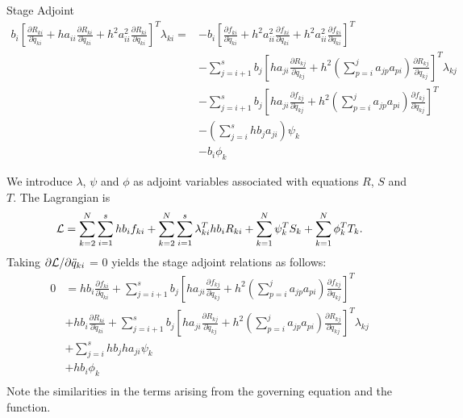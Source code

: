 \documentclass{beamer}
\newcommand{\pd}[2]{\frac{\partial #1}{\partial #2}}
\begin{document}
\begin{frame}[allowframebreaks]
  \scriptsize{
    \begin{block}{Stage Adjoint}
      \begin{equation}\nonumber
        \begin{split}
          b_i \left[ \pd{R_{ki}}{\ddot{q}_{ki}} + ha_{ii} \pd{R_{ki}}{\dot{q}_{ki}} + h^2 a_{ii}^2 \pd{R_{ki}}{{q}_{ki}} \right]^T \lambda_{ki} = & - b_i \left[ \pd{f_{ki}}{\ddot{q}_{ki}} + h^2a_{ii}^2 \pd{f_{ki}}{\dot{q}_{ki}} + h^2a_{ii}^2 \pd{f_{ki}}{{q}_{ki}} \right]^T \\
          & - \sum_{j=i+1}^s b_j \left[ ha_{ji} \pd{R_{kj}}{\dot{q}_{kj}} 
            + h^2 (\sum_{p=i}^j a_{jp}a_{pi}) 
            \pd{R_{kj}}{{q}_{kj}} \right]^T \lambda_{kj} \\
          & -  \sum_{j=i+1}^s b_j \left[ ha_{ji} \pd{f_{kj}}{\dot{q}_{kj}} 
            + h^2 (\sum_{p=i}^j a_{jp}a_{pi}) 
            \pd{f_{kj}}{{q}_{kj}} \right]^T  \\
          & -   (\sum_{j=i}^s h b_j a_{ji}) \psi_{k}  \\
          &  - b_i \phi_{k} 
        \end{split}
      \end{equation}
    \end{block}
  }

  \framebreak
  \tiny{
    We introduce $\lambda$, $\psi$ and $\phi$ as adjoint variables associated with equations $R$, $S$ and $T$. The Lagrangian is
    \[ {\cal{L}} = \sum_{k=2}^{N} \sum_{i=1}^s h b_i f_{ki}  +  \sum_{k=2}^{N} \sum_{i=1}^s\lambda_{ki}^T  h b_i R_{ki}   + \sum_{k=1}^N \psi_k^T S_k + \sum_{k=1}^N \phi_k^T T_k. \]
    Taking $\partial{\cal{L}}/\partial{\ddot{q}_{ki}}$ = 0 yields the stage adjoint relations as follows:
    \begin{equation}\nonumber
      \begin{split}
        0 & = hb_i \pd{f_{ki}}{\ddot{q}_{ki}} + \sum_{j=i+1}^s b_j \left[ ha_{ji} \pd{f_{kj}}{\dot{q}_{kj}} 
          + h^2 (\sum_{p=i}^j a_{jp}a_{pi}) 
          \pd{f_{kj}}{{q}_{kj}} \right]^T \\
        &  + hb_i \pd{R_{ki}}{\ddot{q}_{ki}} + \sum_{j=i+1}^s b_j \left[ ha_{ji} \pd{R_{kj}}{\dot{q}_{kj}} 
          + h^2 (\sum_{p=i}^j a_{jp}a_{pi}) 
          \pd{R_{kj}}{{q}_{kj}} \right]^T \lambda_{kj} \\ 
        &  + \sum_{j=i}^s h b_j h a_{ji} \psi_{k}  \\
        &  +  h b_i \phi_{k} \\
      \end{split}
    \end{equation}
    Note the similarities in the terms arising from the governing
    equation and the function.}


\end{frame}
\end{document}
